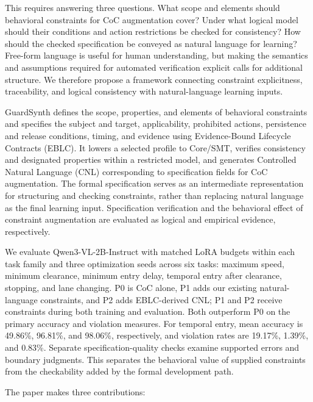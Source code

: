 \documentclass[nolineno]{ieeeaccess}
\begin{document}
This requires answering three questions. What scope and elements should behavioral constraints for CoC augmentation cover? Under what logical model should their conditions and action restrictions be checked for consistency? How should the checked specification be conveyed as natural language for learning? Free-form language is useful for human understanding, but making the semantics and assumptions required for automated verification explicit calls for additional structure. We therefore propose a framework connecting constraint explicitness, traceability, and logical consistency with natural-language learning inputs.\par

GuardSynth defines the scope, properties, and elements of behavioral constraints and specifies the subject and target, applicability, prohibited actions, persistence and release conditions, timing, and evidence using Evidence-Bound Lifecycle Contracts (EBLC). It lowers a selected profile to Core/SMT, verifies consistency and designated properties within a restricted model, and generates Controlled Natural Language (CNL) corresponding to specification fields for CoC augmentation. The formal specification serves as an intermediate representation for structuring and checking constraints, rather than replacing natural language as the final learning input. Specification verification and the behavioral effect of constraint augmentation are evaluated as logical and empirical evidence, respectively.\par

We evaluate Qwen3-VL-2B-Instruct with matched LoRA budgets within each task family and three optimization seeds across six tasks: maximum speed, minimum clearance, minimum entry delay, temporal entry after clearance, stopping, and lane changing. P0 is CoC alone, P1 adds our existing natural-language constraints, and P2 adds EBLC-derived CNL; P1 and P2 receive constraints during both training and evaluation. Both outperform P0 on the primary accuracy and violation measures. For temporal entry, mean accuracy is 49.86\%, 96.81\%, and 98.06\%, respectively, and violation rates are 19.17\%, 1.39\%, and 0.83\%. Separate specification-quality checks examine supported errors and boundary judgments. This separates the behavioral value of supplied constraints from the checkability added by the formal development path.\par

The paper makes three contributions:\par
\end{document}
